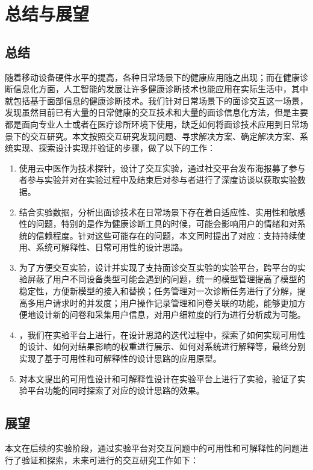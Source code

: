 \chapter{总结与展望}
\section{总结}
随着移动设备硬件水平的提高，各种日常场景下的健康应用随之出现；而在健康诊断信息化方面，人工智能的发展让许多健康诊断技术也能应用在实际生活中，其中就包括基于面部信息的健康诊断技术。我们针对日常场景下的面诊交互这一场景，发现虽然目前已有大量的日常健康的交互技术和大量的面诊信息化方法，但是主要都是面向专业人士或者在医疗诊所环境下使用，缺乏如何将面诊技术应用到日常场景下的交互研究。本文按照交互研究发现问题、寻求解决方案、确定解决方案、系统实现、探索设计实现并验证的步骤，做了以下的工作：

\begin{enumerate}
	\item 使用云中医作为技术探针，设计了交互实验，通过社交平台发布海报募了参与者参与实验并对在实验过程中及结束后对参与者进行了深度访谈以获取实验数据。
	
	\item 结合实验数据，分析出面诊技术在日常场景下存在着自适应性、实用性和敏感性的问题，特别的是作为健康诊断工具的时候，可能会影响用户的情绪和对系统的信赖程度。针对这些可能存在的问题，本文同时提出了对应：支持持续使用、系统可解释性、日常可用性的设计思路。

	\item 为了方便交互实验，设计并实现了支持面诊交互实验的实验平台，跨平台的实验屏蔽了用户不同设备类型可能会遇到的问题，统一的模型管理提高了模型的稳定性，方便新模型的接入和替换；任务管理对一次诊断任务进行了分解，提高多用户请求时的并发度；用户操作记录管理和问卷关联的功能，能够更加方便地设计新的问卷和采集用户信息，对用户细粒度的行为进行分析成为可能。
	
	\item ，我们在实验平台上进行，在设计思路的迭代过程中，探索了如何实现可用性的设计、如何对结果影响的权重进行展示、如何对系统进行解释等，最终分别实现了基于可用性和可解释性的设计思路的应用原型。

	\item 对本文提出的可用性设计和可解释性设计在实验平台上进行了实验，验证了实验平台功能的同时探索了对应的设计思路的效果。
\end{enumerate}



\section{展望}
本文在后续的实验阶段，通过实验平台对交互问题中的可用性和可解释性的问题进行了验证和探索，未来可进行的交互研究工作如下：

